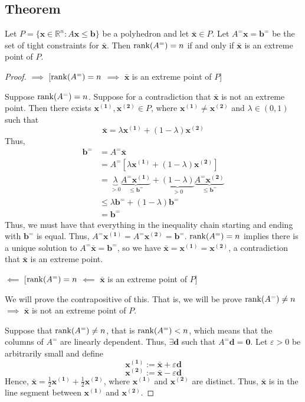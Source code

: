 \begin{thmbox}
    \subsection{Theorem}
    Let $ P=\{\bm{x}\in\mathbb{R}^n:A \bm{x}\le \bm{b}\} $ be 
    a polyhedron and let $ \bm{\bar{x}}\in P $. 
    Let $ A^=\bm{x} = \bm{b}^= $ be the set of tight constraints
    for $ \bm{\bar{x}} $. 
    Then $ \operatorname{rank}(A^=)=n $ if and only if
    $\bm{\bar{x}}$ is an extreme point of $ P $.
\end{thmbox}

\begin{proof}
    $ \implies $ [$\operatorname{rank}(A^=)=n$ $ \implies $ $\bm{\bar{x}}$ is an extreme point of $ P $]
    
    Suppose $ \operatorname{rank}(A^=)=n $. Suppose for a contradiction that
    $\bm{\bar{x}}$ is not an extreme point. Then there exists
    $ \bm{x^{(1)}}, \bm{x^{(2)}}\in P$, where
    $ \bm{x^{(1)}} \neq \bm{x^{(2)}} $ and $ \lambda\in(0,1) $
    such that
    \[ \bm{\bar{x}}=\lambda \bm{x^{(1)}}+(1-\lambda)\bm{x^{(2)}}\]
    Thus,
    \begin{align*}
        \bm{b^=}&=A^=\bm{\bar{x}}\\
        &=A^=[\lambda \bm{x^{(1)}}+(1-\lambda)\bm{x^{(2)}}]\\
        &=\underbrace{\lambda}_{>0}
        \underbrace{A^=\bm{x^{(1)}}}_{\le \bm{b^=}}
        +\underbrace{(1-\lambda)}_{>0} 
        \underbrace{A^=\bm{x^{(2)}}}_{\le \bm{b^=}}\\
        &\le\lambda\bm{b^=}+(1-\lambda)\bm{b^=}\\
        &=\bm{b^=}
    \end{align*}
    Thus, we must have that everything in the inequality chain
    starting and ending with $ \bm{b^=} $ is equal. Thus,
    $ A^=\bm{x^{(1)}}=A^=\bm{x^{(2)}}=\bm{b^=}$.
    $ \operatorname{rank}(A^=)=n $ implies there is a unique solution
    to $ A^=\bm{\bar{x}}=\bm{b^=}$, so we have 
    $ \bm{\bar{x}}=\bm{x^{(1)}}=\bm{x^{(2)}} $, a contradiction that
    $ \bm{\bar{x}} $ is an extreme point.

    $ \impliedby $ [$\operatorname{rank}(A^=)=n$ $ \impliedby $ $\bm{\bar{x}}$ is an extreme point of $ P $]

    We will prove the contrapositive of this. That is, we will be prove
    $ \operatorname{rank}(A^=)\neq n $ $\implies$ $\bm{\bar{x}}$ is not 
    an extreme point of $ P $.

    Suppose that $ \operatorname{rank}(A^=)\neq n $, that is $ \operatorname{rank}(A^=)<n $, which
    means that the columns of $ A^= $ are linearly dependent. Thus,
    $ \exists \bm{d} $ such that $ A^=\bm{d}=\bm{0} $. Let
    $ \varepsilon > 0 $ be arbitrarily small and define
    \[ \bm{x^{(1)}} := \bm{\bar{x}} + \varepsilon \bm{d} \]
    \[ \bm{x^{(2)}} := \bm{\bar{x}} - \varepsilon \bm{d} \]
Hence, $ \bm{\bar{x}}=\frac{1}{2}\bm{x^{(1)}}+\frac{1}{2} \bm{x^{(2)}} $, where
$ \bm{x^{(1)}} $ and $ \bm{x^{(2)}} $ are distinct. Thus,
$ \bm{\bar{x}} $ is in the line segment between $ \bm{x^{(1)}} $ and
$ \bm{x^{(2)}} $. 


\end{proof}

